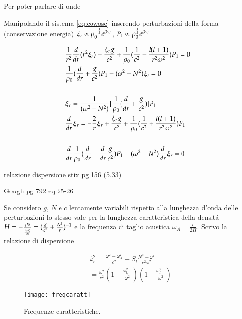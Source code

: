\documentclass[oneside,12pt,fleqn]{memoir}
\begin{document}
{\begin{todo}{Per poter parlare di onde}
\end{todo}

Manipolando il sistema \ref{eq:cowosc} inserendo perturbazioni della forma (conservazione energia) $\xi_r\propto\rho_0\expy{-\frac{1}{2}}\exp{ik_rr}$, $P_1\propto\rho_0\expy{\frac{1}{2}}\exp{ik_rr}$:

\begin{align*}
&\frac{1}{r^2}\TDof{r}(r^2\xi_r)-\frac{\xi_rg}{c^2}+\frac{1}{\rho_0}(\frac{1}{c^2}-\frac{l(l+1)}{r^2\omega^2})P_1=0\\
&\frac{1}{\rho_0}(\TDof{r}+\frac{g}{c^2})P_1-(\omega^2-N^2)\xi_r=0\\
\\
&\xi_r=\frac{1}{(\omega^2-N^2)}[\frac{1}{\rho_0}(\TDof{r}+\frac{g}{c^2})]P_1\\
&\TDof{r}\xi_r=-\frac{2}{r}\xi_r+\frac{\xi_rg}{c^2}+\frac{1}{\rho_0}(\frac{1}{c^2}+\frac{l(l+1)}{r^2\omega^2})P_1\\
\\
&\TDof{r} \frac{1}{\rho_0}(\TDof{r}+\TDof{r} \frac{g}{c^2})P_1-(\omega^2-N^2)\TDof{r} \xi_r=0
\end{align*}

\begin{todo}{relazione dispersione stix pg 156 (5.33)}

Gough pg 792 eq 25-26

\end{todo}

Se considero $g$, $N$ e $c$ lentamente variabili rispetto alla lunghezza d'onda delle perturbazioni lo stesso vale per la lunghezza caratteristica della densit\'a $H=-\frac{\rho_0}{\TDy{r}{\rho_0}}=(\frac{g}{c^2}+\frac{N^2}{g})\expy{-1}$ e la frequenza di taglio acustica $\omega_A=\frac{c}{2H}$. Scrivo la relazione di dispersione

\begin{align}
&k_r^2=\frac{\omega^2-\omega_A^2}{c^2}+S_l\frac{N^2-\omega^2}{c^2\omega^2}\label{eq:localdispersion}\\
&=\frac{\omega^2}{c^2}(1-\frac{\omega_{l,+}^2}{\omega^2})(1-\frac{\omega_{l,-}^2}{\omega^2})\nonumber
\end{align}

\begin{figure}[!ht]
\centering
\texttt{[image: freqcaratt]}
\caption{Frequenze caratteristiche.}
\label{fig:freqcaratt}
\end{figure}

\clearpage


}
\end{document}
